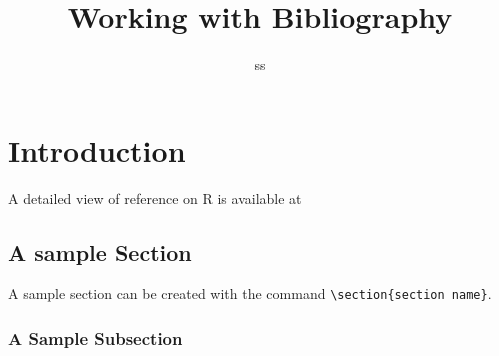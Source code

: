 \documentclass[a4paper,10pt]{report}
\title{Working with Bibliography}
\author{ss}
\begin{document}
\maketitle
\chapter{Introduction}
A detailed view of reference  on R is available at \cite{bonaccorso2017machine}
\newpage
\section{A sample Section}
A sample section can be created with the command \verb+\section{section name}+.
\subsection{A Sample Subsection}



\newpage
\printindex
\end{document}
